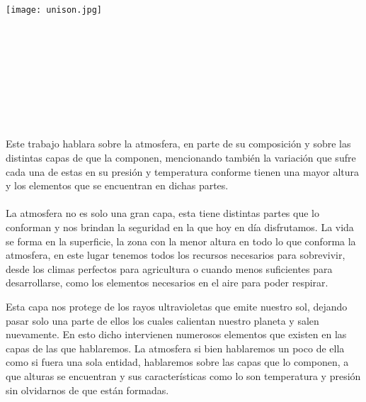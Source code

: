 \documentclass[a4paper,12pt]{report}
\begin{document}
\begin{titlepage}
\begin{center}
\vspace{0.5cm}
\texttt{[image: unison.jpg]}
\\[0.5cm]
{\fontsize{28}{6}\selectfont{Universidad de Sonora}}
\\[0.5cm]
{\fontsize{22}{6}\selectfont{Departamento de Física}}
\\[2cm]
{\fontsize{24}{6}\selectfont{La estructura de la atmósfera}}
\\[2cm]
{\fontsize{22}{6}\selectfont{Alumno:}}
\\[0.5cm]
{\fontsize{18}{6}\selectfont{Torres Flores Luis Alfonso}}
\\[2cm]
{\fontsize{22}{6}\selectfont{Profesor:}}
\\[0.5cm]
{\fontsize{18}{6}\selectfont{Dr. Carlos Lizarraga Celaya}}
\\[3cm]
{\fontsize{14}{6}\selectfont{Miércoles 25 de Enero del 2017}}
\end{center}
\end{titlepage}

{\fontsize{24}{6}\selectfont{Breve resumen}}
\\[0.5cm] 
 Este trabajo hablara sobre la atmosfera, en parte de su composición y sobre las distintas capas de que la componen, mencionando también la variación que sufre cada una de estas en su presión y temperatura conforme tienen una mayor altura y los elementos que se encuentran en dichas partes.
\\[2cm]

{\fontsize{24}{6}\selectfont{Introducción}}
\\[0.5cm]
La atmosfera no es solo una gran capa, esta tiene distintas partes que lo conforman y nos brindan la seguridad en la que hoy en día disfrutamos. La vida se forma en la superficie, la zona con la menor altura en todo lo que conforma la atmosfera, en este lugar tenemos todos los recursos necesarios para sobrevivir, desde los climas perfectos para agricultura o cuando menos suficientes para desarrollarse, como los elementos necesarios en el aire para poder respirar. 

Esta capa nos protege de los rayos ultravioletas que emite nuestro sol, dejando pasar solo una parte de ellos los cuales calientan nuestro planeta y salen nuevamente. En esto dicho intervienen numerosos elementos que existen en las capas de las que hablaremos. La atmosfera si bien hablaremos un poco de ella como si fuera una sola entidad, hablaremos sobre las capas que lo componen, a que alturas se encuentran y sus características como lo son temperatura y presión sin olvidarnos de que están formadas. 
\\[2cm]
\newpage
\end{document}
